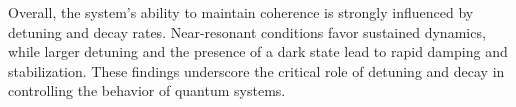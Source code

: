\documentclass{article}
\begin{document}
Overall, the system's ability to maintain coherence is strongly influenced by detuning and decay rates. Near-resonant conditions favor sustained dynamics, while larger detuning and the presence of a dark state lead to rapid damping and stabilization. These findings underscore the critical role of detuning and decay in controlling the behavior of quantum systems.





\end{document}
